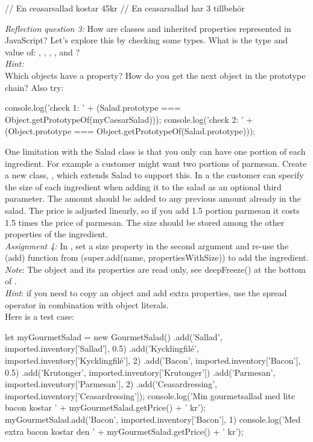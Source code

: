 \documentclass[fleqn, article, a4paper]{memoir}
\begin{document}
\begin{Assignments}
\begin{Code}
// En ceasarsallad kostar 45kr
// En ceasarsallad har 3 tillbehör
\end{Code}
\emph{Reflection question 3:} How are classes and inherited properties represented in JavaScript? Let's explore this by checking some types. What is the type and value of: , , , , and ?
\\ \emph{Hint: } 
\\Which objects have a  property? How do you get the next object in the prototype chain? Also try:
\begin{Code}
console.log('check 1: ' + 
  (Salad.prototype === Object.getPrototypeOf(myCaesarSalad)));
console.log('check 2: ' + 
  (Object.prototype === Object.getPrototypeOf(Salad.prototype)));
 \end{Code}

\item One limitation with the Salad class is that you only can have one portion of each ingredient. For example a customer might want two portions of parmesan. Create a new class, , which extends Salad to support this. In a  the customer can specify the size of each ingredient when adding it to the salad as an optional third parameter. The amount should be added to any previous amount already in the salad. The price is adjusted linearly, so if you add 1.5 portion parmesan it costs 1.5 times the price of parmesan. The size should be stored among the other properties of the ingredient.
\\\emph{Assignment 4:} In , set a size property in the second argument and re-use the \code(add) function from  (super.add(name, propertiesWithSize)) to add the ingredient. 
\\\emph{Note}: The  object and its properties are read only, see deepFreeze() at the bottom of .
\\\emph{Hint}: if you need to copy an object and add extra properties, use the spread operator in combination with object literals.
\\ Here is a test case:
\begin{Code}
let myGourmetSalad = new GourmetSalad()
.add('Sallad', imported.inventory['Sallad'], 0.5)
.add('Kycklingfilé', imported.inventory['Kycklingfilé'], 2)
.add('Bacon', imported.inventory['Bacon'], 0.5)
.add('Krutonger', imported.inventory['Krutonger'])
.add('Parmesan', imported.inventory['Parmesan'], 2)
.add('Ceasardressing', imported.inventory['Ceasardressing']);
console.log('Min gourmetsallad med lite bacon kostar '
    + myGourmetSalad.getPrice() + ' kr');
myGourmetSalad.add('Bacon', imported.inventory['Bacon'], 1)
console.log('Med extra bacon kostar den '
    + myGourmetSalad.getPrice() + ' kr');


\end{Code}
\end{Assignments}
\end{document}
